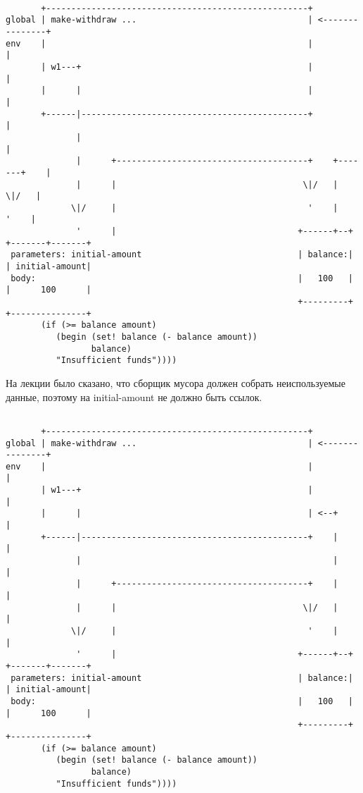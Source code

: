 \documentclass[10pt,a4paper]{article}
\begin{document}
\begin{lstlisting}

       +----------------------------------------------------+
global | make-withdraw ...                                  | <---------------+
env    |                                                    |                 |
       | w1---+                                             |                 |
       |      |                                             |                 |
       +------|---------------------------------------------+                 |
              |                                                               |
              |      +--------------------------------------+    +-------+    |
              |      |                                     \|/   |      \|/   |
             \|/     |                                      '    |       '    |
              '      |                                    +------+--+ +-------+-------+
 parameters: initial-amount                               | balance:| | initial-amount|
 body:                                                    |   100   | |      100      |
                                                          +---------+ +---------------+
       (if (>= balance amount)
          (begin (set! balance (- balance amount))
                 balance)
          "Insufficient funds"))))

\end{lstlisting}
На лекции было сказано, что сборщик мусора должен собрать
неиспользуемые данные, поэтому на initial-amount не должно быть
ссылок.
\begin{lstlisting}

       +----------------------------------------------------+
global | make-withdraw ...                                  | <---------------+
env    |                                                    |                 |
       | w1---+                                             |                 |
       |      |                                             | <--+            |
       +------|---------------------------------------------+    |            |
              |                                                  |            |
              |      +--------------------------------------+    |            |
              |      |                                     \|/   |            |
             \|/     |                                      '    |            |
              '      |                                    +------+--+ +-------+-------+
 parameters: initial-amount                               | balance:| | initial-amount|
 body:                                                    |   100   | |      100      |
                                                          +---------+ +---------------+
       (if (>= balance amount)
          (begin (set! balance (- balance amount))
                 balance)
          "Insufficient funds"))))

\end{lstlisting}
\end{document}
